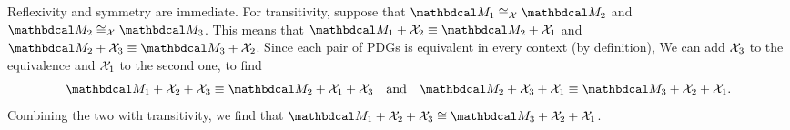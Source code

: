 \begin{subappendices}
    
    \begin{lproof} \label{proof:cong-modX-equiv}
        Reflexivity and symmetry are immediate. For transitivity, suppose that $\dg M_1 \cong_\X \dg M_2$ and $\dg M_2 \cong_\X \dg M_3$. 
        This means that
            $\dg M_1 + \X_2 \equiv \dg M_2 + \X_1$ and $\dg M_2 + \X_3 \equiv \dg M_3 + \X_2$. 
        Since each pair of PDGs is equivalent in every context (by definition),
        We can add $\mathcal X_3$ to the equivalence and $\mathcal X_1$ to the second one, to find
        \[
            \dg M_1 + \X_2 + \X_3 \equiv \dg M_2 + \X_1 + \X_3
            \quad\text{and}\quad
            \dg M_2 + \X_3 + \X_1 \equiv \dg M_3 + \X_2 + \X_1. 
        \]
        Combining the two with transitivity, we find that 
        $\dg M_1 + \X_2 + \X_3 \cong \dg M_3 + \X_2 + \X_1$.
            

\end{lproof}
\end{subappendices}
